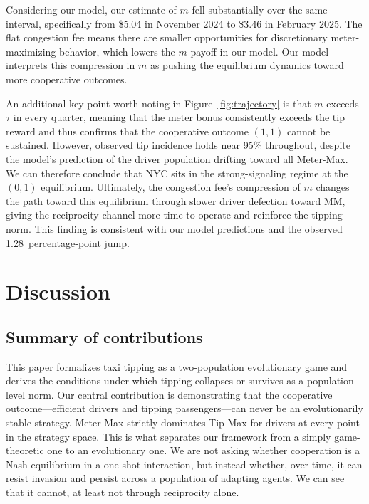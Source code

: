 \documentclass[pdflatex,sn-mathphys-num]{sn-jnl}%
\theoremstyle{thmstyleone}%
\theoremstyle{thmstyletwo}%
\theoremstyle{thmstylethree}%
\begin{document}
Considering our model, our estimate of $m$ fell substantially over the same interval, specifically from \$5.04 in November 2024 to \$3.46 in February 2025. The flat congestion fee means there are smaller opportunities for discretionary meter-maximizing behavior, which lowers the $m$ payoff in our model. Our model interprets this compression in $m$ as pushing the equilibrium dynamics toward more cooperative outcomes.

An additional key point worth noting in Figure~\ref{fig:trajectory} is that $m$ exceeds $\tau$ in every quarter, meaning that the meter bonus consistently exceeds the tip reward and thus confirms that the cooperative outcome $(1, 1)$ cannot be sustained. However, observed tip incidence holds near 95\% throughout, despite the model's prediction of the driver population drifting toward all Meter-Max. We can therefore conclude that NYC sits in the strong-signaling regime at the $(0, 1)$ equilibrium. Ultimately, the congestion fee's compression of $m$ changes the path toward this equilibrium through slower driver defection toward MM, giving the reciprocity channel more time to operate and reinforce the tipping norm. This finding is consistent with our model predictions and the observed 1.28~percentage-point jump.

\section{Discussion}\label{sec:discussion}

\subsection{Summary of contributions}\label{sec:contributions}
This paper formalizes taxi tipping as a two-population evolutionary game and derives the conditions under which tipping collapses or survives as a population-level norm. Our central contribution is demonstrating that the cooperative outcome---efficient drivers and tipping passengers---can never be an evolutionarily stable strategy. Meter-Max strictly dominates Tip-Max for drivers at every point in the strategy space. This is what separates our framework from a simply game-theoretic one to an evolutionary one. We are not asking whether cooperation is a Nash equilibrium in a one-shot interaction, but instead whether, over time, it can resist invasion and persist across a population of adapting agents. We can see that it cannot, at least not through reciprocity alone.
\end{document}
